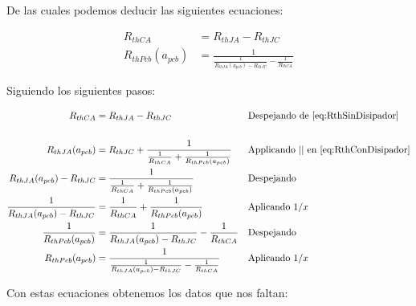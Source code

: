 De las cuales podemos deducir las siguientes ecuaciones:

\begin{subequations}
    \label{eq:ResRth}
    \begin{align}
        \label{eq:RthJA} R_{thCA}&=R_{thJA}-R_{thJC}  \\
        \label{eq:RthPcb} R_{thPcb}(a_{pcb})&=\frac{1}{\frac{1}{R_{thJA}(a_{pcb}) - R_{thJC}} -\frac{1}{R_{thCA}}}
    \end{align}
\end{subequations}

Siguiendo los siguientes pasos:

\begin{align*}
    R_{thCA}&=R_{thJA}-R_{thJC} &&\text{Despejando de \ref{eq:RthSinDisipador}} \\
    \\ 
    R_{thJA}(a_{pcb})&=R_{thJC}+\frac{1}{\frac{1}{R_{thCA}}+\frac{1}{R_{thPcb}(a_{pcb})}} &&\text{Applicando  || en  \ref{eq:RthConDisipador}} \\
    R_{thJA}(a_{pcb}) - R_{thJC} &=\frac{1}{\frac{1}{R_{thCA}}+\frac{1}{R_{thPcb}(a_{pcb})}} && \text{Despejando} \\ 
    \frac{1}{R_{thJA}(a_{pcb}) - R_{thJC}} &= \frac{1}{R_{thCA}}+\frac{1}{R_{thPcb}(a_{pcb})} && \text{Aplicando $1/x$}\\
    \frac{1}{R_{thPcb}(a_{pcb})}&=\frac{1}{R_{thJA}(a_{pcb}) - R_{thJC}} -\frac{1}{R_{thCA}} && \text{Despejando}\\
    R_{thPcb}(a_{pcb})&=\frac{1}{\frac{1}{R_{thJA}(a_{pcb}) - R_{thJC}} -\frac{1}{R_{thCA}}} &&\text{Aplicando $1/x$}
\end{align*}

Con estas ecuaciones obtenemos los datos que nos faltan:

